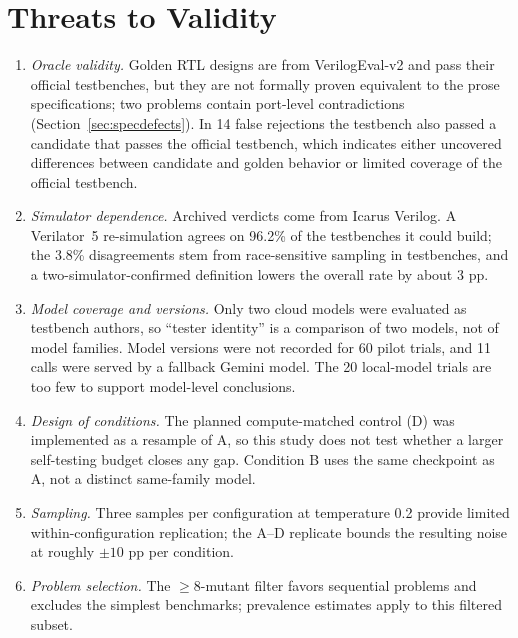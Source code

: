 \documentclass[conference]{IEEEtran}
\begin{document}
\section{Threats to Validity}
\begin{enumerate}
    \item \textit{Oracle validity.} Golden RTL designs are from VerilogEval-v2 and pass their official testbenches, but they are not formally proven equivalent to the prose specifications; two problems contain port-level contradictions (Section~\ref{sec:specdefects}). In 14 false rejections the testbench also passed a candidate that passes the official testbench, which indicates either uncovered differences between candidate and golden behavior or limited coverage of the official testbench.
    \item \textit{Simulator dependence.} Archived verdicts come from Icarus Verilog. A Verilator~5 re-simulation agrees on 96.2\% of the testbenches it could build; the 3.8\% disagreements stem from race-sensitive sampling in testbenches, and a two-simulator-confirmed definition lowers the overall rate by about 3 pp.
    \item \textit{Model coverage and versions.} Only two cloud models were evaluated as testbench authors, so ``tester identity'' is a comparison of two models, not of model families. Model versions were not recorded for 60 pilot trials, and 11 calls were served by a fallback Gemini model. The 20 local-model trials are too few to support model-level conclusions.
    \item \textit{Design of conditions.} The planned compute-matched control (D) was implemented as a resample of A, so this study does not test whether a larger self-testing budget closes any gap. Condition B uses the same checkpoint as A, not a distinct same-family model.
    \item \textit{Sampling.} Three samples per configuration at temperature 0.2 provide limited within-configuration replication; the A--D replicate bounds the resulting noise at roughly $\pm 10$ pp per condition.
    \item \textit{Problem selection.} The $\ge 8$-mutant filter favors sequential problems and excludes the simplest benchmarks; prevalence estimates apply to this filtered subset.
\end{enumerate}
\end{document}

